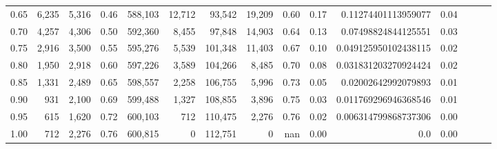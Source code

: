 \begin{tabular}{rrrrrrrrrrrrrrr}
0.65 &    6,235 &  5,316 &  0.46 &  588,103 &   12,712 &   93,542 &   19,209 &  0.60 &  0.17 &   0.11274401113959077 &      0.04 \\
0.70 &    4,257 &  4,306 &  0.50 &  592,360 &    8,455 &   97,848 &   14,903 &  0.64 &  0.13 &   0.07498824844125551 &      0.03 \\
0.75 &    2,916 &  3,500 &  0.55 &  595,276 &    5,539 &  101,348 &   11,403 &  0.67 &  0.10 &  0.049125950102438115 &      0.02 \\
0.80 &    1,950 &  2,918 &  0.60 &  597,226 &    3,589 &  104,266 &    8,485 &  0.70 &  0.08 &  0.031831203270924424 &      0.02 \\
0.85 &    1,331 &  2,489 &  0.65 &  598,557 &    2,258 &  106,755 &    5,996 &  0.73 &  0.05 &   0.02002642992079893 &      0.01 \\
0.90 &      931 &  2,100 &  0.69 &  599,488 &    1,327 &  108,855 &    3,896 &  0.75 &  0.03 &  0.011769296946368546 &      0.01 \\
0.95 &      615 &  1,620 &  0.72 &  600,103 &      712 &  110,475 &    2,276 &  0.76 &  0.02 &  0.006314799868737306 &      0.00 \\
1.00 &      712 &  2,276 &  0.76 &  600,815 &        0 &  112,751 &        0 &   nan &  0.00 &                   0.0 &      0.00 \\
\bottomrule
\end{tabular}

